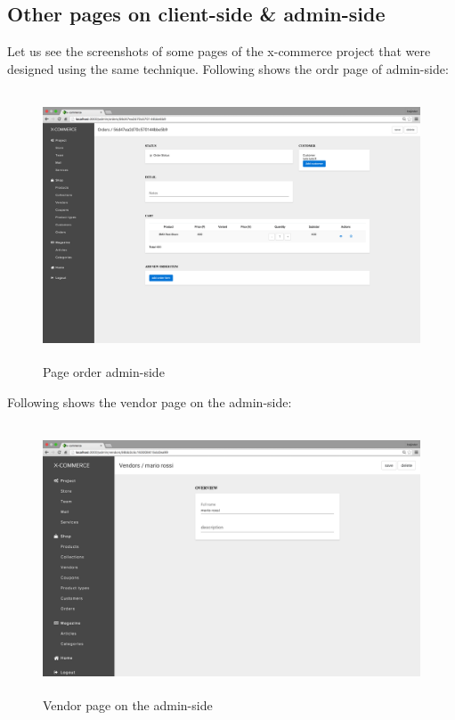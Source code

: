 \subsection{Other pages on client-side \& admin-side}
Let us see the screenshots of some pages of the x-commerce project that were designed using the same technique.
\newline
Following shows the ordr page of admin-side:
\begin{figure}[htb]
\centering
\includegraphics[width=13cm, height=8cm]{images/chapter4/page-order-all.png}\hfill
\caption[page order admin-side]{Page order admin-side}
\label{fig:page_order_admin_side}
\end{figure}
Following shows the vendor page on the admin-side:
\begin{figure}[htb]
\centering
\includegraphics[width=13cm, height=8cm]{images/chapter4/page-vendor-all.png}\hfill
\caption[Vendor page on the  admin-side]{Vendor page on the admin-side}
\label{fig:page_vendor_admin_side}
\end{figure}


